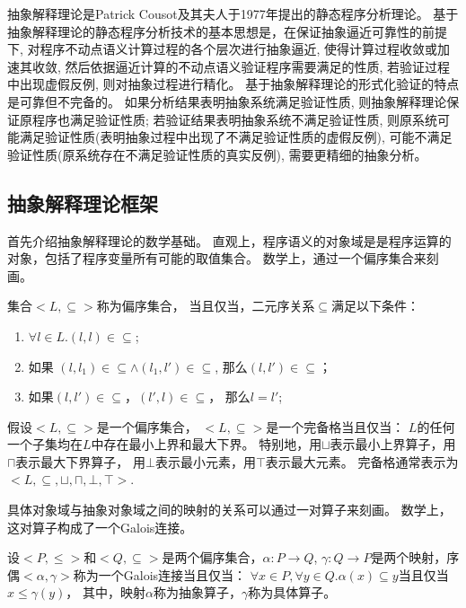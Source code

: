 抽象解释理论是Patrick Cousot及其夫人于1977年提出的静态程序分析理论。
基于抽象解释理论的静态程序分析技术的基本思想是，在保证抽象逼近可靠性的前提下,
对程序不动点语义计算过程的各个层次进行抽象逼近, 使得计算过程收敛或加速其收敛,
然后依据逼近计算的不动点语义验证程序需要满足的性质,
若验证过程中出现虚假反例, 则对抽象过程进行精化。
基于抽象解释理论的形式化验证的特点是可靠但不完备的。
如果分析结果表明抽象系统满足验证性质, 则抽象解释理论保证原程序也满足验证性质;
若验证结果表明抽象系统不满足验证性质,
则原系统可能满足验证性质(表明抽象过程中出现了不满足验证性质的虚假反例),
可能不满足验证性质(原系统存在不满足验证性质的真实反例), 需要更精细的抽象分析。



\subsection{抽象解释理论框架}

首先介绍抽象解释理论的数学基础。
直观上，程序语义的对象域是是程序运算的对象，包括了程序变量所有可能的取值集合。
数学上，通过一个偏序集合来刻画。

\begin{definition}
集合$<L, \subseteq>$称为偏序集合，
当且仅当，二元序关系$\subseteq$满足以下条件：
\begin{enumerate}
\item $\forall l \in L. (l,l)\in \subseteq$;
\item 如果 $(l,l_1)\in \subseteq \wedge (l_1, l')\in \subseteq$,
	那么$(l,l')\in \subseteq$；
\item 如果$(l,l')\in \subseteq$，$(l',l)\in \subseteq$，
	那么$l = l'$;
\end{enumerate}
\end{definition}


\begin{definition}
假设$<L, \subseteq>$是一个偏序集合，
$<L, \subseteq>$是一个完备格当且仅当：
$L$的任何一个子集均在$L$中存在最小上界和最大下界。
特别地，用$\sqcup$表示最小上界算子，用$\sqcap$表示最大下界算子，
用$\bot$表示最小元素，用$\top$表示最大元素。
完备格通常表示为$<L, \subseteq, \sqcup, \sqcap, \bot, \top>$.
\end{definition}


具体对象域与抽象对象域之间的映射的关系可以通过一对算子来刻画。
数学上，这对算子构成了一个Galois连接。


\begin{definition}
设$<P, \leq>$和$<Q, \subseteq>$是两个偏序集合，$\alpha:P \rightarrow Q$,
$\gamma: Q \rightarrow P$是两个映射，序偶$<\alpha, \gamma>$称为一个Galois连接当且仅当：
$\forall x\in P, \forall y\in Q. \alpha(x) \subseteq y$当且仅当$x\leq \gamma(y)$，
其中，映射$\alpha$称为抽象算子，$\gamma$称为具体算子。
\end{definition}

